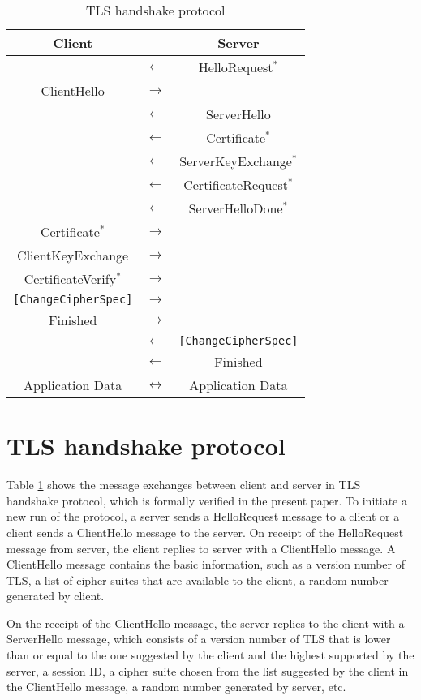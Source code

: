 \documentclass[a4paper,fleqn]{cas-dc}
\begin{document}
\begin{table}[]
\centering
    \begin{tabular}{ c c c }
    Client &  & Server \\ 
    \hline
    & $\leftarrow$ & HelloRequest$^*$ \\  
    ClientHello & $\rightarrow$ & \\ 
    & $\leftarrow$ & ServerHello \\  
    & $\leftarrow$ & Certificate$^*$ \\  
    & $\leftarrow$ & ServerKeyExchange$^*$ \\  
    & $\leftarrow$ & CertificateRequest$^*$ \\  
    & $\leftarrow$ & ServerHelloDone$^*$ \\  
    Certificate$^*$ & $\rightarrow$ & \\ 
    ClientKeyExchange & $\rightarrow$ & \\ 
    CertificateVerify$^*$ & $\rightarrow$ & \\ 
    \verb![ChangeCipherSpec]! & $\rightarrow$ & \\ 
    Finished & $\rightarrow$ & \\ 
    & $\leftarrow$ & \verb![ChangeCipherSpec]! \\  
    & $\leftarrow$ & Finished \\ 
    Application Data & $\leftrightarrow$ & Application Data \\ 
    \end{tabular}
    \caption{TLS handshake protocol}
    \label{tab:tb1}
\end{table}

\section{TLS handshake protocol}\label{tls}
Table \ref{tab:tb1} shows the message exchanges between client and server in TLS handshake protocol, which is formally verified in the present paper. To initiate a new run of the protocol, a server sends a HelloRequest message to a client or a client sends a ClientHello message to the server. On receipt of the HelloRequest message from server, the client replies to server with a ClientHello message. A ClientHello message contains the basic information, such as a version number of TLS, a list of cipher suites that are available to the client, a random number generated by client.

On the receipt of the ClientHello message, the server replies to the client with a ServerHello message, which consists of a version number of TLS that is lower than or equal to the one suggested by the client and the highest supported by the server, a session ID, a cipher suite chosen from the list suggested by the client in the ClientHello message, a random number generated by server, etc. 
\end{document}
